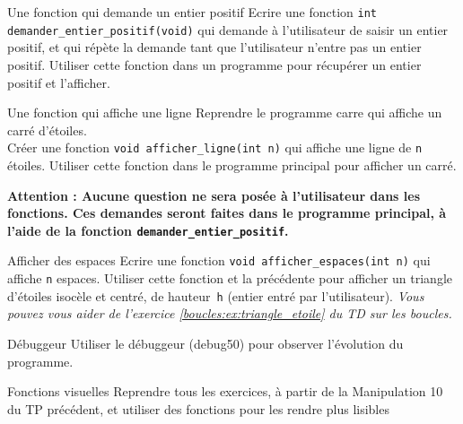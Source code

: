
\begin{UPSTIexercice}{Une fonction qui demande un entier positif}
	\UPSTIquestion Ecrire une fonction \texttt{int demander\_entier\_positif(void)} qui demande à l'utilisateur de saisir un entier positif, et qui répète la demande tant que l'utilisateur n'entre pas un entier positif.
	\UPSTIquestion Utiliser cette fonction dans un programme pour récupérer un entier positif et l'afficher.
\end{UPSTIexercice}

\begin{UPSTIexercice}{Une fonction qui affiche une ligne}
	Reprendre le programme carre qui affiche un carré d'étoiles.\\
	\UPSTIquestion Créer une fonction \texttt{void afficher\_ligne(int n)} qui affiche une ligne de \texttt{n} étoiles.
	\UPSTIquestion Utiliser cette fonction dans le programme principal pour afficher un carré.
	
\textbf{Attention : Aucune question ne sera posée à l'utilisateur dans les fonctions. Ces demandes seront faites dans le programme principal, à l'aide de la fonction \texttt{demander\_entier\_positif}.
}\end{UPSTIexercice}

\begin{UPSTIexercice}{Afficher des espaces}
	\UPSTIquestion Ecrire une fonction \texttt{void afficher\_espaces(int n)} qui affiche \texttt{n} espaces.
	\UPSTIquestion Utiliser cette fonction et la précédente pour afficher un triangle d'étoiles isocèle et centré, de hauteur~\texttt{h} (entier entré par l'utilisateur).
	\textit{Vous pouvez vous aider de l'exercice \ref{boucles:ex:triangle_etoile} du TD sur les boucles.}
\end{UPSTIexercice}

\begin{UPSTIexercice}{Débuggeur}
	Utiliser le débuggeur (debug50) pour observer l'évolution du programme. 
\end{UPSTIexercice}

\begin{UPSTIexercice}{Fonctions visuelles}
	\UPSTIquestion Reprendre tous les exercices, à partir de la Manipulation 10 du TP précédent, et utiliser  des fonctions pour les rendre plus lisibles
\end{UPSTIexercice}


